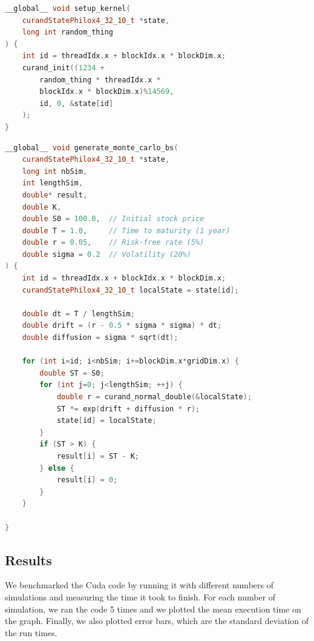 \documentclass[12pt,a4paper]{report}
\begin{document}
\begin{tcolorbox}[colback=green!5!white, colframe=green!75!black, title=Cuda random number generator]
\begin{lstlisting}[language=C++]
__global__ void setup_kernel(
    curandStatePhilox4_32_10_t *state, 
    long int random_thing
) {
    int id = threadIdx.x + blockIdx.x * blockDim.x;
    curand_init((1234 + 
        random_thing * threadIdx.x * 
        blockIdx.x * blockDim.x)%14569, 
        id, 0, &state[id]
    );
}
\end{lstlisting}
\end{tcolorbox}

\begin{tcolorbox}[colback=blue!5!white, colframe=blue!50!black, title=Cuda compute simulation]
\begin{lstlisting}[language=C++]
__global__ void generate_monte_carlo_bs(
    curandStatePhilox4_32_10_t *state,
    long int nbSim,
    int lengthSim,
    double* result,
    double K,
    double S0 = 100.0,  // Initial stock price
    double T = 1.0,     // Time to maturity (1 year)
    double r = 0.05,    // Risk-free rate (5%)
    double sigma = 0.2  // Volatility (20%)
) {
    int id = threadIdx.x + blockIdx.x * blockDim.x;
    curandStatePhilox4_32_10_t localState = state[id];

    double dt = T / lengthSim;
    double drift = (r - 0.5 * sigma * sigma) * dt;
    double diffusion = sigma * sqrt(dt);

    for (int i=id; i<nbSim; i+=blockDim.x*gridDim.x) {
        double ST = S0;
        for (int j=0; j<lengthSim; ++j) {
            double r = curand_normal_double(&localState);
            ST *= exp(drift + diffusion * r);
            state[id] = localState;
        }
        if (ST > K) {
            result[i] = ST - K;
        } else {
            result[i] = 0;
        }
    }

}
\end{lstlisting}
\end{tcolorbox}

\subsection{Results}

We benchmarked the Cuda code by running it with different numbers of simulations and measuring the time it took to finish. For each number of simulation, we ran the code 5 times and we plotted the mean execution time on the graph. Finally, we also plotted error bars, which are the standard deviation of the run times.
\end{document}

